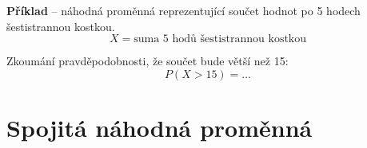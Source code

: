 \begin{compactitem}
    \item \textbf{Příklad} -- náhodná proměnná reprezentující součet hodnot po 5 hodech šestistrannou kostkou.
    $$ X = \text{suma 5 hodů šestistrannou kostkou} $$ \begin{compactitem}
        \item Zkoumání pravděpodobnosti, že součet bude větší než 15:
        $$ P(X > 15) = \ldots$$
    \end{compactitem}

\end{compactitem}


\section{Spojitá náhodná proměnná}

